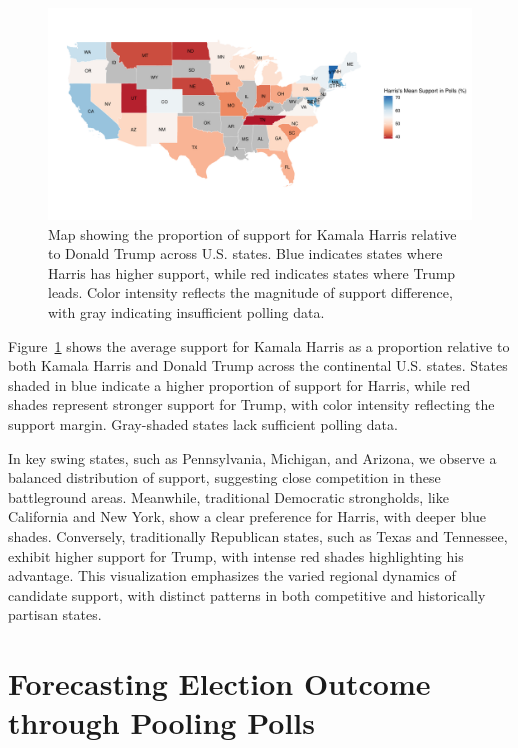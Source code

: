 \documentclass[
  letterpaper,
  DIV=11,
  numbers=noendperiod]{scrartcl}
\begin{document}
\begin{figure}

{\centering \includegraphics{paper_files/figure-pdf/fig-map1-1.pdf}

}

\caption{\label{fig-map1}Map showing the proportion of support for
Kamala Harris relative to Donald Trump across U.S. states. Blue
indicates states where Harris has higher support, while red indicates
states where Trump leads. Color intensity reflects the magnitude of
support difference, with gray indicating insufficient polling data.}

\end{figure}

Figure~\ref{fig-map1} shows the average support for Kamala Harris as a
proportion relative to both Kamala Harris and Donald Trump across the
continental U.S. states. States shaded in blue indicate a higher
proportion of support for Harris, while red shades represent stronger
support for Trump, with color intensity reflecting the support margin.
Gray-shaded states lack sufficient polling data.

In key swing states, such as Pennsylvania, Michigan, and Arizona, we
observe a balanced distribution of support, suggesting close competition
in these battleground areas. Meanwhile, traditional Democratic
strongholds, like California and New York, show a clear preference for
Harris, with deeper blue shades. Conversely, traditionally Republican
states, such as Texas and Tennessee, exhibit higher support for Trump,
with intense red shades highlighting his advantage. This visualization
emphasizes the varied regional dynamics of candidate support, with
distinct patterns in both competitive and historically partisan states.

\hypertarget{sec-model}{%
\section{Forecasting Election Outcome through Pooling
Polls}\label{sec-model}}
\end{document}
